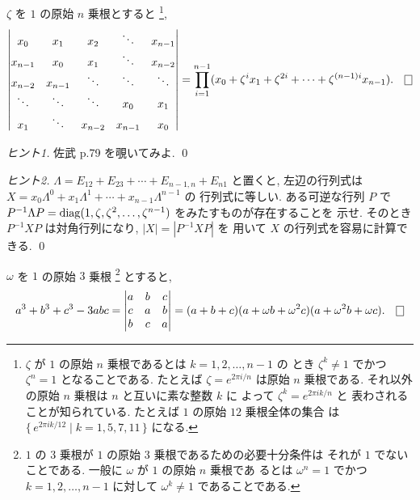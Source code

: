 \documentclass[12pt,twoside]{jarticle}
\begin{document}
\begin{question}[巡回行列式]
  \label{q:cyclic-det}
  $\zeta$ を $1$ の原始 $n$ 乗根とすると%
  \footnote{$\zeta$ が $1$ の原始 $n$ 乗根であるとは $k=1,2,\ldots,n-1$ の
    とき $\zeta^k\ne 1$ でかつ $\zeta^n=1$ となることである.
    たとえば $\zeta = e^{2\pi i/n}$ は原始 $n$ 乗根である.
    それ以外の原始 $n$ 乗根は $n$ と互いに素な整数 $k$ に
    よって $\zeta^k=e^{2\pi ik/n}$ と
    表わされることが知られている.
    たとえば $1$ の原始 $12$ 乗根全体の集合
    は $\{\,e^{2\pi ik/12}\mid k=1,5,7,11\,\}$ になる.},
  \begin{equation*}
    \begin{vmatrix}
      x_0     & x_1     & x_2     & \ddots  & x_{n-1} \\
      x_{n-1} & x_0     & x_1     & \ddots  & x_{n-2} \\
      x_{n-2} & x_{n-1} & \ddots  & \ddots  & \ddots \\
      \ddots  & \ddots  & \ddots  & x_0     & x_1 \\
      x_1     & \ddots  & x_{n-2} & x_{n-1} & x_0 \\
    \end{vmatrix}
    = \prod_{i=1}^{n-1}
    (x_0 + \zeta^i x_1 + \zeta^{2i} + \cdots + \zeta^{(n-1)i}x_{n-1}).
    \qed
  \end{equation*}
\end{question}

\begin{proof}[ヒント1]
  佐武 \cite{satake} p.79 を覗いてみよ. \qed
\end{proof}

\begin{proof}[ヒント2]
  $\Lambda=E_{12}+E_{23}+\cdots+E_{n-1,n}+E_{n1}$ と置くと, 
  左辺の行列式は $X = x_0\Lambda^0+x_1\Lambda^1+\cdots+x_{n-1}\Lambda^{n-1}$ の
  行列式に等しい.  ある可逆な行列 $P$ で $P^{-1}\Lambda P
  = \mathop{\mathrm{diag}}\nolimits(1,\zeta,\zeta^2,\ldots,\zeta^{n-1})$ をみたすものが存在することを
  示せ. そのとき $P^{-1}XP$ は対角行列になり, $|X|=|P^{-1}XP|$ を
  用いて $X$ の行列式を容易に計算できる.
  \qed
\end{proof}

\begin{question}
  $\omega$ を $1$ の原始 $3$ 乗根%
  \footnote{$1$ の $3$ 乗根が $1$ の原始 $3$ 乗根であるための必要十分条件は
    それが $1$ でないことである.  一般に $\omega$ が $1$ の原始 $n$ 乗根であ
    るとは $\omega^n=1$ でかつ $k=1,2,\ldots,n-1$ に対して $\omega^k\ne 1$ 
    であることである.}%
  とすると,
  \begin{equation*}
    a^3 + b^3 + c^3 - 3abc =
    \begin{vmatrix}
      a & b & c \\
      c & a & b \\
      b & c & a \\
    \end{vmatrix}
    = (a+b+c)(a+\omega b+\omega^2 c)(a+\omega^2b+\omega c).
    \qed
  \end{equation*}
\end{question}
\end{document}
